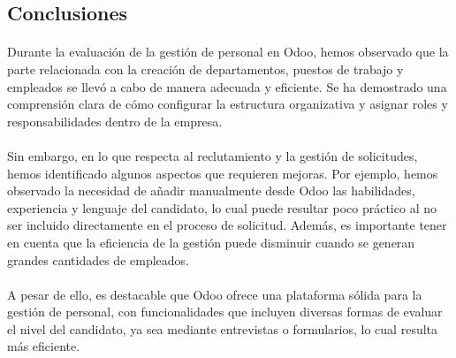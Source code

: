 \subsection{Conclusiones}
\paragraph{}
Durante la evaluación de la gestión de personal en Odoo, hemos observado que la parte relacionada con la creación de departamentos, puestos de trabajo y empleados se llevó a cabo de manera adecuada y eficiente. Se ha demostrado una comprensión clara de cómo configurar la estructura organizativa y asignar roles y responsabilidades dentro de la empresa. 
\paragraph{}
Sin embargo, en lo que respecta al reclutamiento y la gestión de solicitudes, hemos identificado algunos aspectos que requieren mejoras. Por ejemplo, hemos observado la necesidad de añadir manualmente desde Odoo las habilidades, experiencia y lenguaje del candidato, lo cual puede resultar poco práctico al no ser incluido directamente en el proceso de solicitud. Además, es importante tener en cuenta que la eficiencia de la gestión puede disminuir cuando se generan grandes cantidades de empleados.
\paragraph{}
A pesar de ello, es destacable que Odoo ofrece una plataforma sólida para la gestión de personal, con funcionalidades que incluyen diversas formas de evaluar el nivel del candidato, ya sea mediante entrevistas o formularios, lo cual resulta más eficiente.